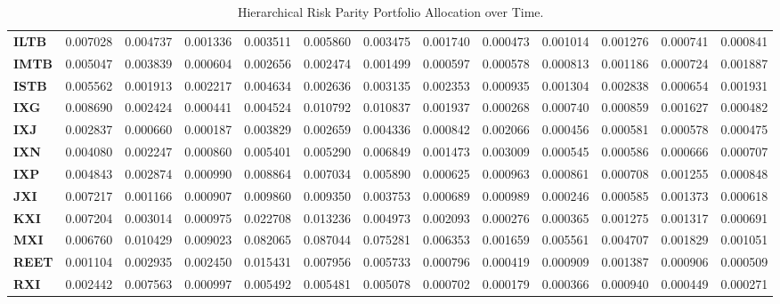 \begin{table}[h!]
{\begin{tabular}{lrrrrrrrrrrrr}
        \textbf{ILTB} & 0.007028 & 0.004737 & 0.001336 & 0.003511 & 0.005860 & 0.003475 & 0.001740 & 0.000473 & 0.001014 & 0.001276 & 0.000741 & 0.000841 \\
        \textbf{IMTB} & 0.005047 & 0.003839 & 0.000604 & 0.002656 & 0.002474 & 0.001499 & 0.000597 & 0.000578 & 0.000813 & 0.001186 & 0.000724 & 0.001887 \\
        \textbf{ISTB} & 0.005562 & 0.001913 & 0.002217 & 0.004634 & 0.002636 & 0.003135 & 0.002353 & 0.000935 & 0.001304 & 0.002838 & 0.000654 & 0.001931 \\
        \textbf{IXG}  & 0.008690 & 0.002424 & 0.000441 & 0.004524 & 0.010792 & 0.010837 & 0.001937 & 0.000268 & 0.000740 & 0.000859 & 0.001627 & 0.000482 \\
        \textbf{IXJ}  & 0.002837 & 0.000660 & 0.000187 & 0.003829 & 0.002659 & 0.004336 & 0.000842 & 0.002066 & 0.000456 & 0.000581 & 0.000578 & 0.000475 \\
        \textbf{IXN}  & 0.004080 & 0.002247 & 0.000860 & 0.005401 & 0.005290 & 0.006849 & 0.001473 & 0.003009 & 0.000545 & 0.000586 & 0.000666 & 0.000707 \\
        \textbf{IXP}  & 0.004843 & 0.002874 & 0.000990 & 0.008864 & 0.007034 & 0.005890 & 0.000625 & 0.000963 & 0.000861 & 0.000708 & 0.001255 & 0.000848 \\
        \textbf{JXI}  & 0.007217 & 0.001166 & 0.000907 & 0.009860 & 0.009350 & 0.003753 & 0.000689 & 0.000989 & 0.000246 & 0.000585 & 0.001373 & 0.000618 \\
        \textbf{KXI}  & 0.007204 & 0.003014 & 0.000975 & 0.022708 & 0.013236 & 0.004973 & 0.002093 & 0.000276 & 0.000365 & 0.001275 & 0.001317 & 0.000691 \\
        \textbf{MXI}  & 0.006760 & 0.010429 & 0.009023 & 0.082065 & 0.087044 & 0.075281 & 0.006353 & 0.001659 & 0.005561 & 0.004707 & 0.001829 & 0.001051 \\
        \textbf{REET} & 0.001104 & 0.002935 & 0.002450 & 0.015431 & 0.007956 & 0.005733 & 0.000796 & 0.000419 & 0.000909 & 0.001387 & 0.000906 & 0.000509 \\
        \textbf{RXI}  & 0.002442 & 0.007563 & 0.000997 & 0.005492 & 0.005481 & 0.005078 & 0.000702 & 0.000179 & 0.000366 & 0.000940 & 0.000449 & 0.000271
    \end{tabular}}
    \caption{Hierarchical Risk Parity Portfolio Allocation over Time.}
\end{table}